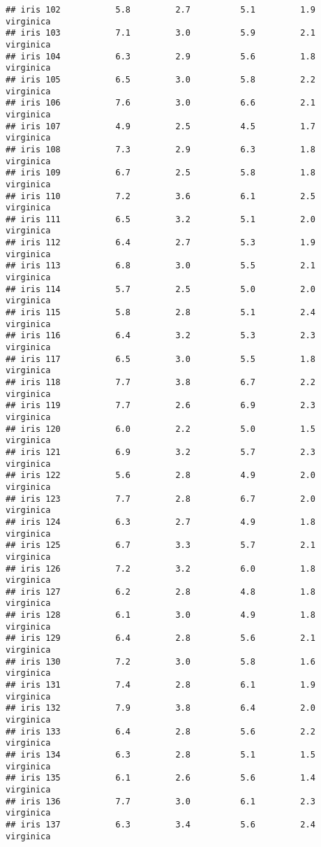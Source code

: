 \documentclass[
]{article}
\begin{document}
\begin{verbatim}
## iris 102           5.8         2.7          5.1         1.9  virginica
## iris 103           7.1         3.0          5.9         2.1  virginica
## iris 104           6.3         2.9          5.6         1.8  virginica
## iris 105           6.5         3.0          5.8         2.2  virginica
## iris 106           7.6         3.0          6.6         2.1  virginica
## iris 107           4.9         2.5          4.5         1.7  virginica
## iris 108           7.3         2.9          6.3         1.8  virginica
## iris 109           6.7         2.5          5.8         1.8  virginica
## iris 110           7.2         3.6          6.1         2.5  virginica
## iris 111           6.5         3.2          5.1         2.0  virginica
## iris 112           6.4         2.7          5.3         1.9  virginica
## iris 113           6.8         3.0          5.5         2.1  virginica
## iris 114           5.7         2.5          5.0         2.0  virginica
## iris 115           5.8         2.8          5.1         2.4  virginica
## iris 116           6.4         3.2          5.3         2.3  virginica
## iris 117           6.5         3.0          5.5         1.8  virginica
## iris 118           7.7         3.8          6.7         2.2  virginica
## iris 119           7.7         2.6          6.9         2.3  virginica
## iris 120           6.0         2.2          5.0         1.5  virginica
## iris 121           6.9         3.2          5.7         2.3  virginica
## iris 122           5.6         2.8          4.9         2.0  virginica
## iris 123           7.7         2.8          6.7         2.0  virginica
## iris 124           6.3         2.7          4.9         1.8  virginica
## iris 125           6.7         3.3          5.7         2.1  virginica
## iris 126           7.2         3.2          6.0         1.8  virginica
## iris 127           6.2         2.8          4.8         1.8  virginica
## iris 128           6.1         3.0          4.9         1.8  virginica
## iris 129           6.4         2.8          5.6         2.1  virginica
## iris 130           7.2         3.0          5.8         1.6  virginica
## iris 131           7.4         2.8          6.1         1.9  virginica
## iris 132           7.9         3.8          6.4         2.0  virginica
## iris 133           6.4         2.8          5.6         2.2  virginica
## iris 134           6.3         2.8          5.1         1.5  virginica
## iris 135           6.1         2.6          5.6         1.4  virginica
## iris 136           7.7         3.0          6.1         2.3  virginica
## iris 137           6.3         3.4          5.6         2.4  virginica

\end{verbatim}
\end{document}
